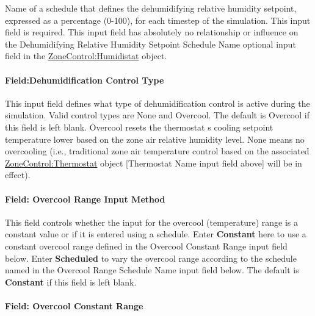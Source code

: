 Name of a schedule that defines the dehumidifying relative humidity setpoint, expressed as a percentage (0-100), for each timestep of the simulation. This input field is required. This input field has absolutely no relationship or influence on the Dehumidifying Relative Humidity Setpoint Schedule Name optional input field in the \hyperref[zonecontrolhumidistat]{ZoneControl:Humidistat} object.

\paragraph{Field:Dehumidification Control Type}\label{fielddehumidification-control-type}

This input field defines what type of dehumidification control is active during the simulation. Valid control types are None and Overcool. The default is Overcool if this field is left blank. Overcool resets the thermostat s cooling setpoint temperature lower based on the zone air relative humidity level. None means no overcooling (i.e., traditional zone air temperature control based on the associated \hyperref[zonecontrolthermostat]{ZoneControl:Thermostat} object {[}Thermostat Name input field above{]} will be in effect).

\paragraph{Field: Overcool Range Input Method}\label{field-overcool-range-input-method}

This field controls whether the input for the overcool (temperature) range is a constant value or if it is entered using a schedule. Enter \textbf{Constant} here to use a constant overcool range defined in the Overcool Constant Range input field below. Enter \textbf{Scheduled} to vary the overcool range according to the schedule named in the Overcool Range Schedule Name input field below. The default is \textbf{Constant} if this field is left blank.

\paragraph{Field: Overcool Constant Range}\label{field-overcool-constant-range}

